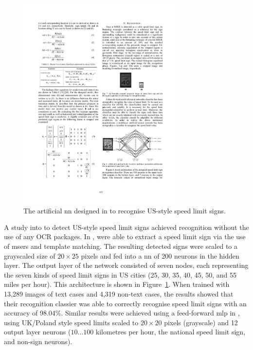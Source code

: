 \begin{figure}[h]
  \centering
  \includegraphics[width=0.75\textwidth]{images/background/kundu2015_nn}
  \caption[A NN designed to recognised speed limit signs]{The artificial  \gls{nn} designed in \citet{Kundu:2015vq} to recognise US-style speed limit signs.}
  \label{fig:background:recognition:kundu2015_nn}
\end{figure}

A \citeyear{Kundu:2015vq} study into  to detect US-style speed limit signs achieved recognition without the use of any OCR packages. In \citep{Kundu:2015vq}, \citeauthor{Kundu:2015vq} were able to extract a speed limit sign via the use of \glspl{mser} and template matching. The resulting detected signs were scaled to a grayscaled size of $20 \times 25$ pixels and fed into a  \gls{nn} of 200 neurons in the hidden layer. The output layer of the network consisted of seven nodes, each representing the seven kinds of speed limit signs in US cities (25, 30, 35, 40, 45, 50, and 55 miles per hour). This architecture is shown in Figure~\ref{fig:background:recognition:kundu2015_nn}. When trained with 13,289 images of text cases and 4,319 non-text cases, the results showed that their recognition classier was able to correctly recognise speed limit signs with an accuracy of 98.04\%. Similar results were achieved using a feed-forward \gls{mlp} in \cite{Eichner:2008dw}, using UK/Poland style speed limits scaled to $20 \times 20$ pixels (grayscale) and 12 output layer neurons ($10 \dots 100$ kilometres per hour, the national speed limit sign, and non-sign neurons).


